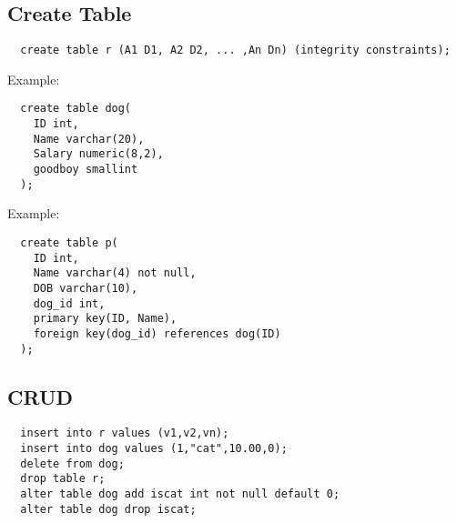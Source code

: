 \documentclass{math}
\begin{document}
\subsection*{Create Table}
\begin{lstlisting}
  create table r (A1 D1, A2 D2, ... ,An Dn) (integrity constraints);
\end{lstlisting}
Example:
\begin{lstlisting}
  create table dog(
    ID int,
    Name varchar(20),
    Salary numeric(8,2),
    goodboy smallint
  );
\end{lstlisting}
Example:
\begin{lstlisting}
  create table p(
    ID int,
    Name varchar(4) not null,
    DOB varchar(10),
    dog_id int,
    primary key(ID, Name),
    foreign key(dog_id) references dog(ID)
  );
\end{lstlisting}

\subsection*{CRUD}
\begin{lstlisting}
  insert into r values (v1,v2,vn);
  insert into dog values (1,"cat",10.00,0);
  delete from dog;
  drop table r;
  alter table dog add iscat int not null default 0;
  alter table dog drop iscat;
\end{lstlisting}
\end{document}
